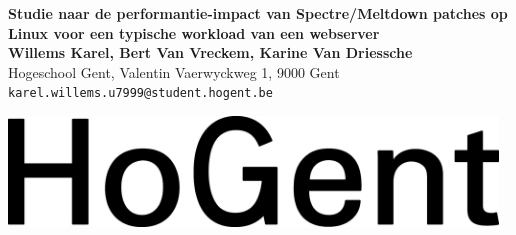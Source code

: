 \documentclass[a0,portrait]{a0poster}
\begin{document}


\begin{minipage}[t]{0.75\linewidth}
\VeryHuge \color{HoGentAccent1} \textbf{Studie naar de performantie-impact van Spectre/Meltdown patches op Linux voor een typische workload van een webserver} \color{Black}\\ %
\huge \textbf{Willems Karel, Bert Van Vreckem, Karine Van Driessche}\\[0.5cm] %
\huge Hogeschool Gent, Valentin Vaerwyckweg 1, 9000 Gent\\[0.4cm] %
\Large \texttt{karel.willems.u7999@student.hogent.be} \\
\end{minipage}
%
\begin{minipage}[t]{0.25\linewidth}
\includegraphics[width=13cm,right]{figures/HG-woordmerk.jpg} 

\end{minipage}

\vspace{1cm} %

\end{document}
